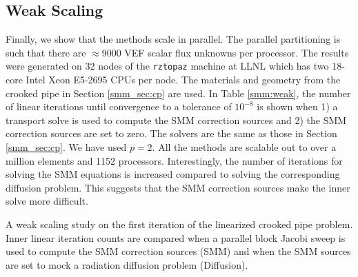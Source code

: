 \documentclass[../doc.tex]{subfiles}
\begin{document}
\subsection{Weak Scaling}
Finally, we show that the methods scale in parallel. The parallel partitioning is such that there are $\approx\!\num{9000}$ VEF scalar flux unknowns per processor. The results were generated on 32 nodes of the \texttt{rztopaz} machine at LLNL which has two 18-core Intel Xeon E5-2695 CPUs per node. The materials and geometry from the crooked pipe in Section \ref{smm_sec:cp} are used. In Table \ref{smm:weak}, the number of linear iterations until convergence to a tolerance of $10^{-8}$ is shown when 1) a transport solve is used to compute the SMM correction sources and 2) the SMM correction sources are set to zero. The solvers are the same as those in Section \ref{smm_sec:cp}. We have used $p=2$. 
All the methods are scalable out to over a million elements and 1152 processors. Interestingly, the number of iterations for solving the SMM equations is increased compared to solving the corresponding diffusion problem. This suggests that the SMM correction sources make the inner solve more difficult. 
\begin{table}
\centering
\caption{A weak scaling study on the first iteration of the linearized crooked pipe problem. Inner linear iteration counts are compared when a parallel block Jacobi sweep is used to compute the SMM correction sources (SMM) and when the SMM sources are set to mock a radiation diffusion problem (Diffusion). }
\label{smm:weak}

\end{table}
\end{document}
